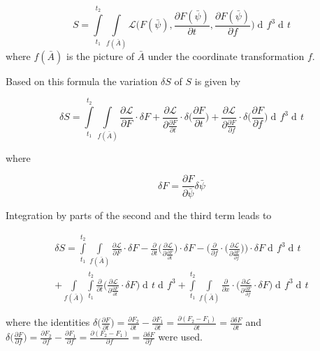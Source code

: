 \documentclass{article}
\DeclareMathOperator{\dd}{d\!}
\begin{document}
\begin{equation}
S = \int\limits_{t_1}^{t_2} \int\limits_{f(\bar{A})} \mathcal{L}\bigg(F(\bar{\psi}), \frac{\partial F(\bar{\psi})}{\partial t}, \frac{\partial F(\bar{\psi})}{\partial f}\bigg) 
\dd f^3 \dd t 
\end{equation}
where $f(\bar{A})$ is the picture of $\bar{A}$ under the coordinate transformation $f$.

Based on this formula the variation $\delta S$ of $S$ is given by

\begin{equation}
\delta S = \int\limits_{t_1}^{t_2} \int\limits_{f(\bar{A})} 
\frac{\partial \mathcal{L}}{\partial F} \cdot \delta F
+ \frac{\partial \mathcal{L}}{\partial \frac{\partial F}{\partial t}} \cdot \delta \bigg(\frac{\partial F}{\partial t}\bigg)
+ \frac{\partial \mathcal{L}}{\partial \frac{\partial F}{\partial f}} \cdot \delta \bigg(\frac{\partial F} {\partial f}\bigg)
\dd f^3 \dd t
\end{equation}

where 

\begin{equation} \label{deltaFDefinition}
\delta F = \frac{\partial F}{\partial \bar{\psi}} \delta \bar{\psi}
\end{equation}


Integration by parts of the second and the third term leads to

\begin{equation} \label{calcDeltaSSection3}
\begin{split}
\delta S = \int\limits_{t_1}^{t_2} \int\limits_{f(\bar{A})} 
\frac{\partial \mathcal{L}}{\partial F} \cdot \delta F
-\frac{\partial}{\partial t} \bigg( \frac{\partial \mathcal{L}}{\partial \frac{\partial F}{\partial t}} \bigg) \cdot \delta F
-\bigg(\frac{\partial}{\partial f} \cdot \bigg( \frac{\partial \mathcal{L}}{\partial \frac{\partial F}{\partial f}} \bigg)\bigg) \cdot \delta F
\dd f^3 \dd t \\
+ \int\limits_{f(\bar{A})} \int\limits_{t_1}^{t_2} \frac{\partial}{\partial t} \bigg(\frac{\partial \mathcal{L}}{\partial \frac{\partial F}{\partial t}} \cdot \delta F \bigg) \dd t \dd f^3
+ \int\limits_{t_1}^{t_2} 
\int\limits_{f(\bar{A})} \frac{\partial}{\partial x} \cdot \bigg( \frac{\partial \mathcal{L}}{\partial \frac{\partial F}{\partial f}} \cdot \delta F \bigg) \dd f^3 \dd t
\end{split}
\end{equation}

where the identities $\delta \big(\frac{\partial F} {\partial t}\big)
= \frac{\partial F_2} {\partial t} - \frac{\partial F_1} {\partial t}
= \frac{\partial (F_2 - F_1)} {\partial t}
= \frac{\partial \delta F} {\partial t}$ 
and
$\delta \big(\frac{\partial F} {\partial f}\big)
= \frac{\partial F_2} {\partial f} - \frac{\partial F_1} {\partial f}
= \frac{\partial (F_2 - F_1)} {\partial f}
= \frac{\partial \delta F} {\partial f}$ 
were used. \\
\end{document}
